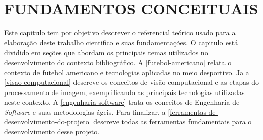 \chapter{\textbf{FUNDAMENTOS CONCEITUAIS}}
\label{cap-fundamentos-conceituais}

Este capitulo tem por objetivo descrever o referencial teórico usado para a elaboração deste trabalho cientifico e suas fundamentações. O capitulo está dividido em seções que abordam os principais temas utilizados no desenvolvimento do contexto bibliográfico. A \autoref{futebol-americano} relata o contexto de futebol americano e tecnologias aplicadas no meio desportivo. Ja a \autoref{visao-computacional} descreve os conceitos de visão computacional e as etapas do processamento de imagem, exemplificando as principais tecnologias utilizadas neste contexto. A \autoref{engenharia-software} trata os conceitos de Engenharia de \textit{Software} e suas metodologias ágeis. Para finalizar, a \autoref{ferramentas-de-desenvolvimento-do-projeto} descreve todas as ferramentas fundamentais para o desenvolvimento desse projeto.







